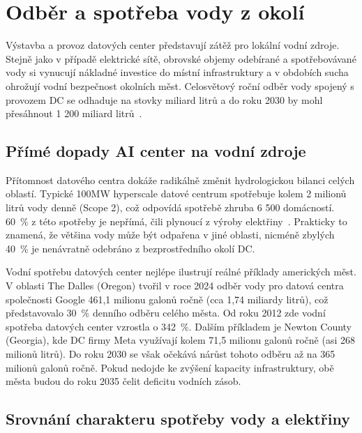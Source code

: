 \section{Odběr a spotřeba vody z okolí}
\label{sec:voda_dopady}

Výstavba a provoz datových center představují zátěž pro lokální vodní zdroje. Stejně jako v případě elektrické sítě, obrovské objemy odebírané a spotřebovávané vody si vynucují nákladné investice do místní infrastruktury a v obdobích sucha ohrožují vodní bezpečnost okolních měst. Celosvětový roční odběr vody spojený s provozem DC se odhaduje na stovky miliard litrů a do roku 2030 by mohl přesáhnout 1 200 miliard litrů~\cite[s.~242]{international_energy_agency_iea_energy_2025}.

\subsection{Přímé dopady AI center na vodní zdroje}
\label{subsec:voda_dopady_prime}

Přítomnost datového centra dokáže radikálně změnit hydrologickou bilanci celých oblastí. Typické 100MW hyperscale datové centrum spotřebuje kolem 2 milionů litrů vody denně (Scope 2), což odpovídá spotřebě zhruba 6 500 domácností. 60~\% z této spotřeby je nepřímá, čili plynoucí z výroby elektřiny~\cite{international_energy_agency_iea_energy_2025}. Prakticky to znamená, že většina vody může být odpařena v jiné oblasti, nicméně zbylých 40~\% je nenávratně odebráno z bezprostředního okolí DC.

Vodní spotřebu datových center nejlépe ilustrují reálné příklady amerických měst. V oblasti The Dalles (Oregon) tvořil v roce 2024 odběr vody pro datová centra společnosti Google 461,1 milionu galonů ročně (cca 1,74 miliardy litrů), což představovalo 30~\% denního odběru celého města. Od roku 2012 zde vodní spotřeba datových center vzrostla o 342~\%. Dalším příkladem je Newton County (Georgia), kde DC firmy Meta využívají kolem 71,5 milionu galonů ročně (asi 268 milionů litrů). Do roku 2030 se však očekává nárůst tohoto odběru až na 365 milionů galonů ročně. Pokud nedojde ke zvýšení kapacity infrastruktury, obě města budou do roku 2035 čelit deficitu vodních zásob.~\cite[s.~4--5]{shah_four_2026}

\subsection{Srovnání charakteru spotřeby vody a elektřiny}
\label{sec:voda_elektrina_srovnani}

